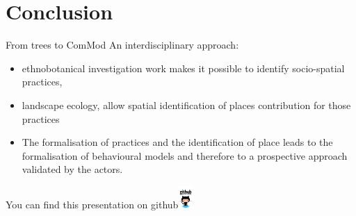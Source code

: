 \documentclass[newPxFont]{beamer}
\begin{document}
\section{Conclusion}
\begin{frame}[c]{From trees to ComMod}
\vspace{-1cm}
An interdisciplinary approach:
\begin{itemize}
  \item ethnobotanical  investigation work makes it possible to identify socio-spatial practices,
  \item landscape ecology, allow spatial identification of places contribution for those practices
  \item The formalisation of practices and the identification of place leads to the formalisation of behavioural models and therefore to a prospective approach validated by the actors.
\end{itemize}
\end{frame}


{
%
\begin{frame}
  \vspace{-1em}
  \begin{minipage}[t][.8\textheight]{\textwidth}

    \vfill

  \end{minipage}
  \vspace{-3.5em}
  \centering
	You can find this presentation on github\includegraphics[height=0.85cm]{img/github}

\end{frame}
}
\end{document}
